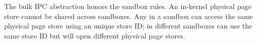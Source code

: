 The bulk IPC abstraction honors the sandbox rules. An in-kernel physical page store cannot be shared across sandboxes.
Any \picoprocs{} in a sandbox
can access the same physical page store using an unique store ID;
\picoprocs{} in different sandboxes can
use the same store ID but will open different physical page stores.


